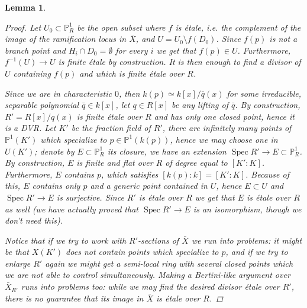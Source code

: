 \documentclass[11pt]{amsart}
\theoremstyle{plain}
\newtheorem{lemma}[theorem]{Lemma}
\theoremstyle{definition}
\newcommand{\on}{\operatorname}
\newcommand{\1}{\mathbb{1}}
\newcommand{\spec}{\on{Spec}}
\renewcommand{\P}{\mathbb{P}}
\begin{document}
\begin{lemma}
\begin{proof}
		Let $U_{0}\subset\P^{1}_{R}$ be the open subset where $f$ is étale, i.e. the complement of the image of the ramification locus in $\bar{X}$, and $U=U_{0}\setminus f(D_{0})$. Since $f(p)$ is not a branch point and $H_{i}\cap D_{0}=\emptyset$ for every $i$ we get that $f(p)\in U$. Furthermore, $f^{-1}(U)\to U$ is finite étale by construction. It is then enough to find a divisor of $U$ containing $f(p)$ and which is finite étale over $R$. 
		
		
		Since we are in characteristic $0$, then $k(p)\simeq k[x]/\bar{q}(x)$ for some irreducible, separable polynomial $\bar{q}\in k[x]$, let $q\in R[x]$ be any lifting of $\bar{q}$. By construction, $R'=R[x]/q(x)$ is finite étale over $R$ and has only one closed point, hence it is a DVR. Let $K'$ be the fraction field of $R'$, there are infinitely many points of $\P^{1}(K')$ which specialize to $p\in\P^{1}(k(p))$, hence we may choose one in $U(K')$; denote by $E\subset \P^{1}_{R}$ its closure, we have an extension $\spec R'\to E\subset\P^{1}_{R}$. By construction, $E$ is finite and flat over $R$ of degree equal to $[K':K]$. Furthermore, $E$ contains $p$, which satisfies $[k(p):k]=[K':K]$. Because of this, $E$ contains only $p$ and a generic point contained in $U$, hence $E\subset U$ and $\spec R'\to E$ is surjective. Since $R'$ is étale over $R$ we get that $E$ is étale over $R$ as well (we have actually proved that $\spec R'\to E$ is an isomorphism, though we don't need this).
  
		
		Notice that if we try to work with $R'$-sections of $\bar{X}$ we run into problems: it might be that $X(K')$ does not contain points which specialize to $p$, and if we try to enlarge $R'$ again we might get a semi-local ring with several closed points which we are not able to control simultaneously. Making a Bertini-like argument over $\bar{X}_{R'}$ runs into problems too: while we may find the desired divisor étale over $R'$, there is no guarantee that its image in $\bar{X}$ is étale over $R$.
		

\end{proof}
\end{lemma}
\end{document}
